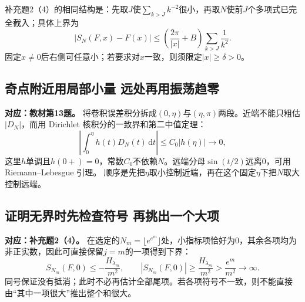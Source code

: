 \documentclass[11pt,a4paper]{ctexart}
\newcommand{\dd}{\,\mathrm d}
\begin{document}
补充题2（4）的相同结构是：先取$J$使$\sum_{k>J}k^{-2}$很小，再取$N$使前$J$个多项式已完全截入；具体上界为
\[
 |S_N(F,x)-F(x)|
 \le\left(\frac{2\pi}{|x|}+B\right)\sum_{k>J}\frac1{k^2}.
\]
固定$x\ne0$后右侧可任意小；若要求对$x$一致，则须限定$|x|\ge\delta>0$。

\subsection{奇点附近用局部小量 远处再用振荡趋零}
\noindent\textbf{对应：教材第13题。}
将卷积误差积分拆成$(0,\eta)$与$(\eta,\pi)$两段。近端不能只粗估$|D_N|$，而用 Dirichlet 核积分的一致界和第二中值定理：
\[
 \left|\int_0^\eta h(t)D_N(t)\dd t\right|
 \le C_0|h(\eta)|\longrightarrow0,
\]
这里$h$单调且$h(0+)=0$，常数$C_0$不依赖$N$。远端分母$\sin(t/2)$远离$0$，可用 Riemann--Lebesgue 引理。
顺序是先把$\eta$取小控制近端，再在这个固定$\eta$下把$N$取大控制远端。

\subsection{证明无界时先检查符号 再挑出一个大项}
\noindent\textbf{对应：补充题2（4）。}
在选定的$N_m=\lfloor e^{e^m}\rfloor$处，小指标项恰好为$0$，其余各项均为非正实数，因此可直接保留$j=m$的一项得到下界：
\[
 S_{N_m}(F,0)\le-\frac{H_{\lambda_m}}{m^2},\qquad
 |S_{N_m}(F,0)|\ge\frac{H_{\lambda_m}}{m^2}
 >\frac{e^m}{m^2}\longrightarrow\infty.
\]
同号保证没有抵消；此时不必再估计全部尾项。若各项符号不一致，则不能直接由“其中一项很大”推出整个和很大。
\end{document}
